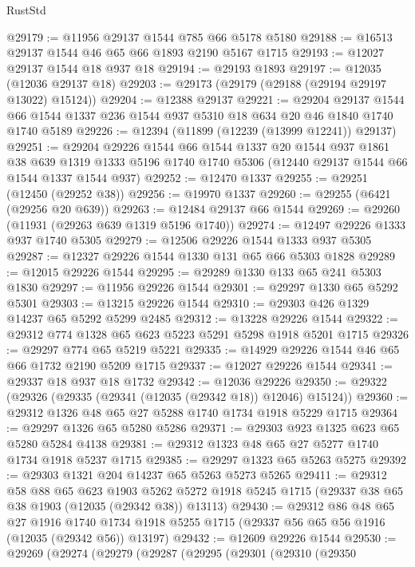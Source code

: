 \begin{lexlean}{RustStd}
\begin{coremodule}
@29179 := @11956 @29137 @1544 @785 @66 @5178 @5180
@29188 := @16513 @29137 @1544 @46 @65 @66 @1893 @2190 @5167 @1715
@29193 := @12027 @29137 @1544 @18 @937 @18
@29194 := @29193 @1893
@29197 := @12035 (@12036 @29137 @18)
@29203 := @29173 (@29179 (@29188 (@29194 @29197 @13022) @15124))
@29204 := @12388 @29137
@29221 := @29204
    @29137
    @1544
    @66
    @1544
    @1337
    @236
    @1544
    @937
    @5310
    @18
    @634
    @20
    @46
    @1840
    @1740
    @1740
    @5189
@29226 := @12394 (@11899 (@12239 (@13999 @12241)) @29137)
@29251 := @29204
    @29226
    @1544
    @66
    @1544
    @1337
    @20
    @1544
    @937
    @1861
    @38
    @639
    @1319
    @1333
    @5196
    @1740
    @1740
    @5306
    (@12440 @29137 @1544 @66 @1544 @1337 @1544 @937)
@29252 := @12470 @1337
@29255 := @29251 (@12450 (@29252 @38))
@29256 := @19970 @1337
@29260 := @29255 (@6421 (@29256 @20 @639))
@29263 := @12484 @29137 @66 @1544
@29269 := @29260 (@11931 (@29263 @639 @1319 @5196 @1740))
@29274 := @12497 @29226 @1333 @937 @1740 @5305
@29279 := @12506 @29226 @1544 @1333 @937 @5305
@29287 := @12327 @29226 @1544 @1330 @131 @65 @66 @5303 @1828
@29289 := @12015 @29226 @1544
@29295 := @29289 @1330 @133 @65 @241 @5303 @1830
@29297 := @11956 @29226 @1544
@29301 := @29297 @1330 @65 @5292 @5301
@29303 := @13215 @29226 @1544
@29310 := @29303 @426 @1329 @14237 @65 @5292 @5299 @2485
@29312 := @13228 @29226 @1544
@29322 := @29312 @774 @1328 @65 @623 @5223 @5291 @5298 @1918 @5201 @1715
@29326 := @29297 @774 @65 @5219 @5221
@29335 := @14929 @29226 @1544 @46 @65 @66 @1732 @2190 @5209 @1715
@29337 := @12027 @29226 @1544
@29341 := @29337 @18 @937 @18 @1732
@29342 := @12036 @29226
@29350 := @29322 (@29326 (@29335 (@29341 (@12035 (@29342 @18)) @12046) @15124))
@29360 := @29312 @1326 @48 @65 @27 @5288 @1740 @1734 @1918 @5229 @1715
@29364 := @29297 @1326 @65 @5280 @5286
@29371 := @29303 @923 @1325 @623 @65 @5280 @5284 @4138
@29381 := @29312 @1323 @48 @65 @27 @5277 @1740 @1734 @1918 @5237 @1715
@29385 := @29297 @1323 @65 @5263 @5275
@29392 := @29303 @1321 @204 @14237 @65 @5263 @5273 @5265
@29411 := @29312
    @58
    @88
    @65
    @623
    @1903
    @5262
    @5272
    @1918
    @5245
    @1715
    (@29337 @38 @65 @38 @1903 (@12035 (@29342 @38)) @13113)
@29430 := @29312
    @86
    @48
    @65
    @27
    @1916
    @1740
    @1734
    @1918
    @5255
    @1715
    (@29337 @56 @65 @56 @1916 (@12035 (@29342 @56)) @13197)
@29432 := @12609 @29226 @1544
@29530 := @29269
    (@29274
      (@29279
        (@29287
          (@29295
            (@29301
              (@29310
                (@29350

\end{coremodule}
\end{lexlean}
